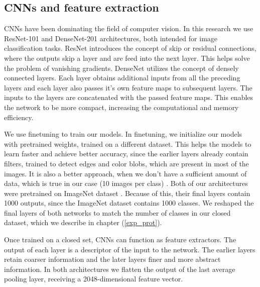 \documentclass[9pt]{IEEEtran}
\begin{document}
\subsection{CNNs and feature extraction}
CNNs have been dominating the field of computer vision. In this research we use ResNet-101 \cite{resnet} and DenseNet-201 \cite{densenet} architectures, both intended for image classification tasks. ResNet introduces the concept of skip or residual connections, where the outputs skip a layer and are feed into the next layer. This helps solve the problem of vanishing gradients. DenseNet utilizes the concept of densely connected layers. Each layer obtains additional inputs from all the preceding layers and each layer also passes it's own feature maps to subsequent layers. The inputs to the layers are concatenated with the passed feature maps. This enables the network to be more compact, increasing the computational and memory efficiency.

We use finetuning to train our models. In finetuning, we initialize our models with pretrained weights, trained on a different dataset. This helps the models to learn faster and achieve better accuracy, since the earlier layers already contain filters, trained to detect edges and color blobs, which are present in most of the images. It is also a better approach, when we don't have a sufficient amount of data, which is true in our case (10 images per class) \cite{cadene2016master}. Both of our architectures were pretrained on ImageNet dataset \cite{imagenet_cvpr09}. Because of this, their final layers contain 1000 outputs, since the ImageNet dataset contains 1000 classes. We reshaped the final layers of both networks to match the number of classes in our closed dataset, which we describe in chapter (\ref{exp_prot}).

Once trained on a closed set, CNNs can function as feature extractors. The output of each layer is a descriptor of the input to the network. The earlier layers retain coarser information and the later layers finer and more abstract information. In both architectures we flatten the output of the last average pooling layer, receiving a 2048-dimensional feature vector. 
\end{document}
